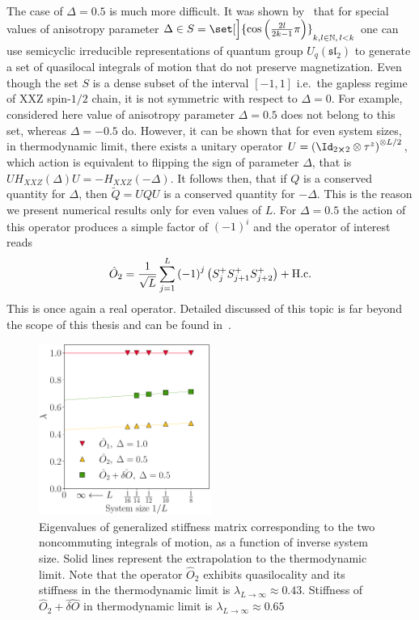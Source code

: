 The case of \(\Delta=0.5\) is much more difficult. It was shown by~\textcite{zadnik2016} that for 
special values of anisotropy parameter \(\Delta \in S = \set[\Big]{\cos\left(\frac{2l}{2k-1}
\pi\right)}_{k,l\in \NN,\, l<k}\) one can use semicyclic irreducible representations
of quantum group \(U_q(\mathfrak{sl}_2)\) to generate a set of quasilocal integrals of 
motion that do not preserve magnetization. Even though the set \(S\) is a dense subset
of the interval \([-1,1]\) i.e.\ the gapless regime of XXZ spin-\(1/2\) chain, it is not
symmetric with respect to \(\Delta=0\). For example, considered here value of anisotropy parameter
\(\Delta=0.5\) does not belong to this set, whereas \(\Delta=-0.5\) do. However, it can be shown
that for even system sizes, in thermodynamic limit, there exists a unitary operator 
\(U = \left(\Id_{2\cross 2}\otimes \tau^z\right)^{\otimes L/2}\), which action is equivalent to flipping the sign 
of parameter \(\Delta\), that is \(UH_{XXZ}(\Delta)U = -H_{XXZ}(-\Delta)\). It follows then,
that if \(Q\) is a conserved quantity for \(\Delta\), then \(\tilde{Q} = UQU\) is a conserved
quantity for \(-\Delta\). This is the reason we present numerical results only for even 
values of \(L\). For \(\Delta=0.5\) the action
of this operator produces a simple factor of \((-1)^i\) and the operator of interest reads
\begin{equation}
  \hat{O}_{2} =\frac{1}{\sqrt{L}} \sum_{j=1}^{L} {(-1)}^j \left( S^{+}_{j}S^{+}_{j+1}S^{+}_{j+2}\right) + \text{H.c.}
  \label{eq:delta 0.5}
\end{equation}  
This is once again a real operator. Detailed discussed of this topic is far beyond the scope of this thesis
and can be found in~\autocite{Ilievski2016a,zadnik2016,Prosen2014c}.

\begin{figure}[htbp]
  \centering
  \includegraphics[width=0.5\textwidth]{Figures/nocomm_int.pdf}
  \caption{Eigenvalues of generalized stiffness matrix corresponding to the two noncommuting
    integrals of motion, as a function of inverse system size. Solid lines represent the extrapolation
    to the thermodynamic limit. Note that the operator \(\hat{O}_2\) exhibits quasilocality
    and its stiffness in the thermodynamic limit is \(\lambda_{L\to\infty} \approx
    0.43\). Stiffness of \(\hat{O}_2 + \hat{\delta O}\) in thermodynamic limit is
    \(\lambda_{L\to\infty} \approx 0.65\)}
  \label{fig: noncommuting integrable}
\end{figure}


